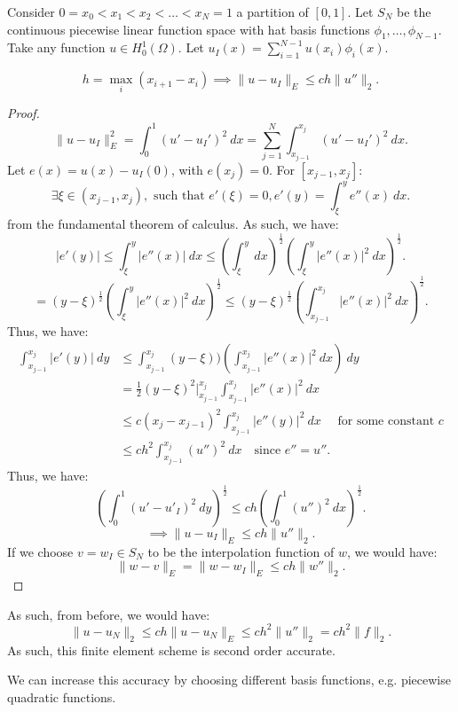 \documentclass[../main/main.tex]{subfiles}
\begin{document}
    Consider $0=x_0<x_1<x_2<\ldots<x_N=1$ a partition of $[0,1]$. Let $S_N$ be the continuous piecewise linear function space with hat basis functions  $\phi_1,\ldots,\phi_{N-  1}$. Take any function $u\in H^1_0(\Omega)$. Let $u_I(x) = \sum_{i=1}^{N-1} u(x_i)\phi_i(x)$.
    \begin{theorem}
        \[
            h=\max_i (x_{i+1}-x_i) \implies \|u-u_I\|_E \le  c h \|u''\|_2
        .\] 
    \end{theorem}
    \begin{proof}
       \[
           \|u-u_I\|_E^2 = \int^1_0 (u'-u_I')^2 ~dx = \sum_{j=1}^{N} \int ^{x_j}_{x_{j-1}} (u'-u_I')^2 ~dx
       .\]  
       Let $e(x) = u(x) - u_I(0)$, with $e(x_j) = 0$. For  $[x_{j-1},x_j]$: \[
           \exists \xi \in (x_{j-1},x_j),\text{ such that } e'(\xi) = 0, e'(y) = \int^y_{\xi}e''(x)~dx 
       .\] from the fundamental theorem of calculus.
       As such, we have: \[
           |e'(y)| \le  \int^y_\xi |e''(x)|~dx \le  \left( \int_\xi^y ~dx \right)^\frac{1}{2} \left( \int^y_\xi |e''(x)|^2~dx \right) ^\frac{1}{2}
       .\] \[
       = (y-\xi)^{\frac{1}{2}} \left( \int^y_\xi|e''(x)|^2~dx \right) ^{\frac{1}{2}} \le  (y-\xi)^{\frac{1}{2}}\left( \int ^{x_j}_{x_{j-1}}|e''(x)|^2~dx\right)^\frac{1}{2}
       .\] Thus, we have: 
\begin{align*} 
    \int ^{x_j}_{x_{j-1}}|e'(y)|~dy &\le  \int ^{x_j}_{x_{j-1}} (y-\xi))\left( \int ^{x_j}_{x_{j-1}}|e''(x)|^2~dx \right) ~dy\\
                                    &= \frac{1}{2}(y-\xi)^2\bigg\rvert ^{x_j}_{x_{j-1}}\int ^{x_j}_{x_{j-1}} |e''(x)|^2~dx \\
                                    &\le c(x_j-x_{j-1})^2\int ^{x_j}_{x_{j-1}} |e''(y)|^2~dx\quad \text{ for some constant $c$}\\
                                    &\le c h^2\int ^{x_j}_{x_{j-1}}(u'')^2~dx \quad\text{since $e'' = u''$}
.\end{align*}
Thus, we have: \[
    \left( \int^1_0(u'-u'_I)^2~dy \right)^{\frac{1}{2}}
    \le c h \left( \int^1_0 (u'')^2 ~dx \right)^{\frac{1}{2}}
.\] \[
\implies \|u-u_I\|_E \le  ch \|u''\|_2
.\] If we choose $v=w_I \in  S_N$ to be the interpolation function of $w$, we would have: \[
\| w-v\|_E = \|w- w_I\|_E \le  ch \| w''\|_2
.\]
    \end{proof} As such, from before, we would have: \[ \|u-u_N\|_2 \le  ch \|u-u_N\|_E \le ch^2\|u''\|_2 = ch^2 \|f\|_2
.\] 
As such, this finite element scheme is second order accurate.
\begin{remark}
    We can increase this accuracy by choosing different basis functions, e.g. piecewise quadratic functions.
\end{remark}
\end{document}
